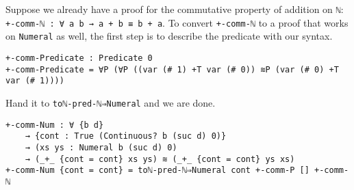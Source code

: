 \documentclass[\main/thesis.tex]{subfiles}
\begin{document}
Suppose we already have a proof for the commutative property of addition
on \lstinline|ℕ|: \lstinline|+-comm-ℕ : ∀ a b → a + b ≡ b + a|.
To convert \lstinline|+-comm-ℕ| to a proof that works on \lstinline|Numeral| as
well, the first step is to describe the predicate with our syntax.

\begin{lstlisting}[basicstyle=\ttfamily\scriptsize]
+-comm-Predicate : Predicate 0
+-comm-Predicate = ∀P (∀P ((var (# 1) +T var (# 0)) ≋P (var (# 0) +T var (# 1))))
\end{lstlisting}

Hand it to \lstinline|toℕ-pred-ℕ⇒Numeral| and we are done.

\begin{lstlisting}[basicstyle=\ttfamily\scriptsize]
+-comm-Num : ∀ {b d}
    → {cont : True (Continuous? b (suc d) 0)}
    → (xs ys : Numeral b (suc d) 0)
    → (_+_ {cont = cont} xs ys) ≋ (_+_ {cont = cont} ys xs)
+-comm-Num {cont = cont} = toℕ-pred-ℕ⇒Numeral cont +-comm-P [] +-comm-ℕ
\end{lstlisting}
\end{document}
